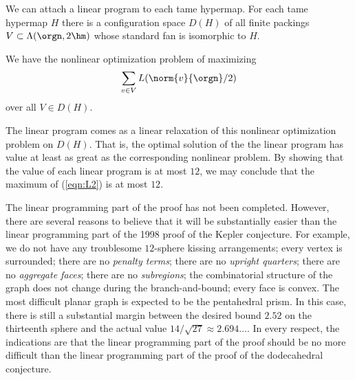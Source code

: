 We can attach a linear program to each tame hypermap.
For each tame hypermap $H$ there is a configuration space $D(H)$ of all
finite packings $V\subset \Lambda(\orgn,2\hm)$ whose standard fan is
isomorphic to $H$.

We have the nonlinear optimization problem of maximizing
\begin{equation}\label{eqn:L2}
\sum_{v\in V} L(\norm{v}{\orgn}/2)
\end{equation}
over all $V\in D(H)$.

The linear program comes as a linear relaxation of this nonlinear
optimization problem on $D(H)$. That is, the optimal solution of the
the linear program has value at least as great as the corresponding
nonlinear problem.  By showing that the value of each linear program
is at most $12$, we may conclude that the maximum of (\ref{eqn:L2})
is at most $12$.


\begin{note}%
The linear programming part of the proof has not been completed.  However, there are several reasons to believe that it will be substantially easier than the linear programming part of the 1998 proof of the Kepler conjecture.  For example, we do not have any troublesome $12$-sphere kissing arrangements; every vertex is surrounded; there are no {\it penalty terms}; there are no {\it upright quarters}; there are no {\it aggregate faces}; there are no {\it subregions}; the combinatorial structure of the graph does not change during the branch-and-bound; every face is convex.  The most difficult planar graph is expected to be the pentahedral prism.  In this case, there is still a substantial margin between the desired bound $2.52$ on the thirteenth sphere and the actual value $14/\sqrt{27}\approx 2.694\ldots$.  In every respect, the indications are that the linear programming part of the proof should be no more difficult than the linear programming part of the proof of the dodecahedral conjecture.
\end{note}

